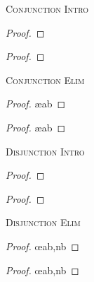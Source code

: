 \setlength{\columnsep}{2.25cm}
\begin{multicols}{2}

\noindent\textsc{Conjunction Intro}

\begin{proof}
	 
\end{proof}

\begin{proof}
	 
\end{proof}
\bigskip

\noindent\textsc{Conjunction Elim}

\begin{proof}
	 \ae{ab}
\end{proof}

\begin{proof}
	 \ae{ab}
\end{proof}
\bigskip



\vfill\null
\columnbreak

\noindent\textsc{Disjunction Intro}

\begin{proof}
	 
\end{proof}

\begin{proof}
	 
\end{proof}
\bigskip


\noindent\textsc{Disjunction Elim}

\begin{proof}
	 \oe{ab,nb}
\end{proof}

\begin{proof}
	 \oe{ab,nb}
\end{proof}
\bigskip


\end{multicols}

